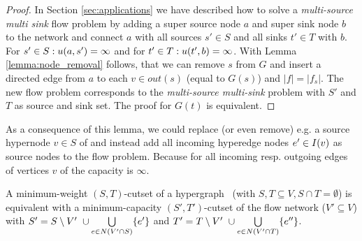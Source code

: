 \begin{proof}
In Section \ref{sec:applications} we have described how to solve a \emph{multi-source 
multi sink} flow problem by adding a super source node $a$ and super sink node $b$ to the network
and connect $a$ with all sources $s' \in S$ and all sinks $t' \in T$ with $b$.
For $s' \in S: u(a,s') = \infty$ and for $t' \in T: u(t',b) = \infty$. With Lemma
\ref{lemma:node_removal} follows, that we can remove $s$ from $G$ and insert
a directed edge from $a$ to each $v \in out(s)$ (equal to $G(s)$) and $|f| = |f_s|$. The new flow problem
corresponds to the \emph{multi-source multi-sink} problem with $S'$ and $T$ as source
and sink set. The proof for $G(t)$ is equivalent.
\end{proof}

As a consequence of this lemma, we could replace (or even remove) 
e.g. a source hypernode $v \in S$ of  and instead add all
incoming hyperedge nodes $e' \in I(v)$ as source nodes to the flow 
problem. Because for all incoming resp. outgoing edges of vertices $v$ of 
 the capacity is $\infty$.

\begin{theorem}
\label{theorem:st_cutset_equal}
A minimum-weight $(S,T)$-cutset of a hypergraph \HypergraphDef~(with $S,T \subseteq V,
S \cap T = \emptyset$) is equivalent with a minimum-capacity $(S',T')$-cutset of the
flow network  ($V' \subseteq V$) with $S' = S \setminus V'\ \cup \bigcup\limits_{e \in N(V' \cap S)} \{e'\}$ and 
$T' = T \setminus V'\ \cup \bigcup\limits_{e \in N(V'\cap T)} \{e''\}$.
\label{theorem:heuer_network}
\end{theorem}

